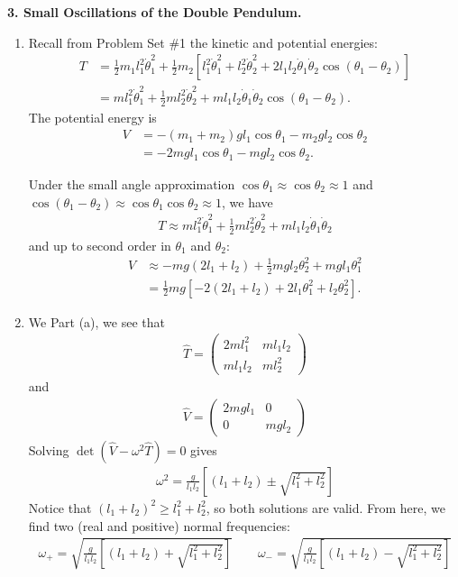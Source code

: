 \documentclass{article}
\theoremstyle{definition}
\newcommand{\f}[2]{\frac{#1}{#2}}
\newcommand{\lb}{\left[}
\newcommand{\rb}{\right]}
\begin{document}
\noindent \textbf{3. Small Oscillations of the Double Pendulum.} 
\begin{enumerate}[label=(\alph*)]
	\item Recall from Problem Set \#1 the kinetic and potential energies:
	\begin{align*}
	T 
	&= \f{1}{2}m_1 l_1^2 \dot\theta_1^2 + \f{1}{2}m_2 \lb l_1^2 \dot\theta_1^2 + l_2^2\dot\theta_2^2 + 2l_1l_2 \dot\theta_1 \dot\theta_2\cos(\theta_1-\theta_2)   \rb \\
	&= ml_1^2\dot\theta_1^2 + \f{1}{2}m l_2^2\dot\theta_2^2 + ml_1l_2\dot\theta_1\dot\theta_2\cos(\theta_1-\theta_2).
	\end{align*}
	The potential energy is 
	\begin{align*}
	V &= -(m_1+m_2)gl_1\cos\theta_1 - m_2 g l_2 \cos\theta_2\\
	&= -2m gl_1\cos\theta_1 - m gl_2\cos\theta_2.
	\end{align*}
	
	Under the small angle approximation $\cos\theta_1 \approx \cos\theta_2 \approx 1$ and $\cos(\theta_1-\theta_2) \approx \cos\theta_1\cos\theta_2 \approx 1$, we have 
	\begin{align*}
	T\approx ml_1^2\dot\theta_1^2 + \f{1}{2}m l_2^2\dot\theta_2^2 + ml_1l_2\dot\theta_1\dot\theta_2
	\end{align*}
	and up to second order in $\theta_1$ and $\theta_2$:
	\begin{align*}
	V &\approx -mg(2l_1+l_2) + \f{1}{2}mg l_2\theta_2^2 + mgl_1\theta_1^2\\
	&= \f{1}{2}mg [-2(2l_1+l_2) + 2l_1\theta_1^2 + l_2\theta_2^2].
	\end{align*}
	
	\item We Part (a), we see that 
	\begin{align*}
	\hat T = \begin{pmatrix}
	2ml_1^2 & ml_1l_2 \\ ml_1l_2 &ml_2^2
	\end{pmatrix}
	\end{align*}
	and 
	\begin{align*}
	\hat V = \begin{pmatrix}
	2mg l_1 & 0 \\ 0 & mgl_2
	\end{pmatrix}
	\end{align*}
	Solving $\det(\hat V - \omega^2 \hat T) = 0$ gives
	\begin{align*}
	\omega^2 = \f{g}{l_1l_2} \lb (l_1+l_2) \pm \sqrt{l_1^2 + l_2^2} \rb
	\end{align*}
	Notice that $(l_1+l_2)^2 \geq l_1^2 + l_2^2$, so both solutions are valid. From here, we find two (real and positive) normal frequencies:
	\begin{align*}
	\boxed{\omega_+ = \sqrt{\f{g}{l_1l_2} \lb (l_1+l_2) + \sqrt{l_1^2 + l_2^2} \rb} 
	\quad\quad 
	\omega_- = \sqrt{\f{g}{l_1l_2} \lb (l_1+l_2) - \sqrt{l_1^2 + l_2^2} \rb}}
	\end{align*}
	

\end{enumerate}
\end{document}
